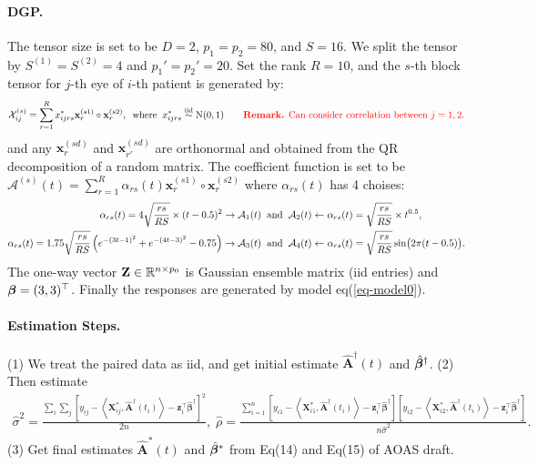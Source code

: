 \documentclass[10pt]{notes}
\begin{document}
\paragraph*{DGP.}
The tensor size is set to be $D=2$, $p_1=p_2=80$, and $S=16$. We split the tensor by $S^{(1)}=S^{(2)}=4$ and $p_1'=p_2'=20$. Set the rank $R=10$, and the $s$-th block tensor for $j$-th eye of $i$-th patient is generated by:
\begin{align*}
    \mathcal{X}_{ij}^{(s)}=\sum_{r=1}^{R}x^*_{ijrs}\mathbf{x}_{r}^{(s1)}\circ\mathbf{x}_{r}^{(s2)},
    \;\;\text{where}\;\;
    x_{ijrs}^*\mathrel{\overset{\mathrm{iid}}{\sim}} \mathrm{N}(0,1)\qquad
    \text{\textcolor{red}{\textbf{Remark.} Can consider correlation between $j=1,2$.}}
\end{align*}
and any $\mathbf{x}_{r}^{(sd)}$ and $\mathbf{x}_{r'}^{(sd)}$ are orthonormal and obtained from the QR decomposition of a random matrix. The coefficient function is set to be $\mathcal{A}^{(s)}(t)=\sum_{r=1}^{R} \alpha_{rs}(t)\mathbf{x}_r^{(s1)}\circ \mathbf{x}_r^{(s2)}$ where $\alpha_{rs}(t)$ has 4 choises:
\begin{align}
    \label{eq-sim-coef1}
    \alpha_{rs}(t)=4\sqrt{\frac{rs}{RS}}\times (t-0.5)^2 
    \to \mathcal{A}_1(t) &\;\;\text{and}\;\;
    \mathcal{A}_2(t) \leftarrow \alpha_{rs}(t)=\sqrt{\frac{rs}{RS}}\times t^{0.5}, \\ 
    \alpha_{rs}(t)=1.75
    \sqrt{\frac{rs}{RS}}
    \left( e^{-(3t-1)^2}+e^{-(4t-3)^2}-0.75\right)
    \to \mathcal{A}_3(t)
    &\;\;\text{and}\;\;
    \mathcal{A}_4(t) \leftarrow
    \alpha_{rs}(t)=\sqrt{\frac{rs}{RS}}\sin\bigl(2\pi(t-0.5)\bigr). 
    \label{eq-sim-coef2}
\end{align}
The one-way vector $\mathbf{Z}\in\mathbb{R}^{n\times p_0}$ is Gaussian ensemble matrix (iid entries) and $\bm{\beta}=(3,3)^\top$. Finally the responses are generated by model eq(\ref{eq-model0}).

\paragraph{Estimation Steps.} (1) We treat the paired data as iid, and get initial estimate $\hat{\mathbf{A}}^\dagger(t)$ and $\hat{\bm{\beta}}^\dagger$. (2) Then estimate
\begin{align*}
\hat{\sigma}^{2}=
\frac{\sum_i\sum_j
\left[
y_{ij}
-
\left\langle \mathbf{X}_{ij}^{*}, \hat{\mathbf{A}}^{\dagger}(t_i) \right\rangle
-
\mathbf{z}_{i}^{\top}\hat{\boldsymbol{\beta}}^{\dagger}
\right]^{2}}{2n}
,\;
\hat{\rho}=\frac{
\sum_{i=1}^{n}
\left[
y_{i1}
-
\left\langle \mathbf{X}_{i1}^{*}, \hat{\mathbf{A}}^{\dagger}(t_i) \right\rangle
-
\mathbf{z}_{i}^{\top}\hat{\boldsymbol{\beta}}^{\dagger}
\right]
\left[
y_{i2}
-
\left\langle \mathbf{X}_{i2}^{*}, \hat{\mathbf{A}}^{\dagger}(t_i) \right\rangle
-
\mathbf{z}_{i}^{\top}\hat{\boldsymbol{\beta}}^{\dagger}
\right]
}{n\hat{\sigma}^2}.
\end{align*}
(3) Get final estimates $\hat{\mathbf{A}}^*(t)$ and $\hat{\bm{\beta}}^*$ from Eq(14) and Eq(15) of AOAS draft.
\end{document}
